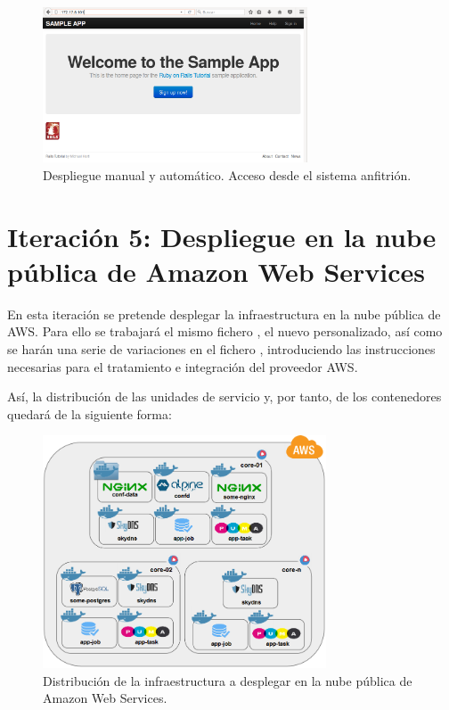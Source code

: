 \begin{figure}[H]
\centering
\includegraphics[width=0.7\textwidth]{images/figures/coreosmanualhost.png}
\caption{Despliegue manual y automático. Acceso desde el sistema anfitrión.}
\end{figure}

\section{Iteración 5: Despliegue en la nube pública de Amazon Web Services}

En esta iteración se pretende desplegar la infraestructura en la nube pública de AWS. Para ello se trabajará el mismo fichero , el nuevo  personalizado, así como se harán una serie de variaciones en el fichero , introduciendo las instrucciones necesarias para el tratamiento e integración del proveedor AWS.

Así, la distribución de las unidades de servicio y, por tanto, de los contenedores quedará de la siguiente forma:

\begin{figure}[H]
\centering
\includegraphics[width=0.75\textwidth]{images/figures/aws-1-iteration.png}
\caption{Distribución de la infraestructura a desplegar en la nube pública de Amazon Web Services.}
\end{figure}

